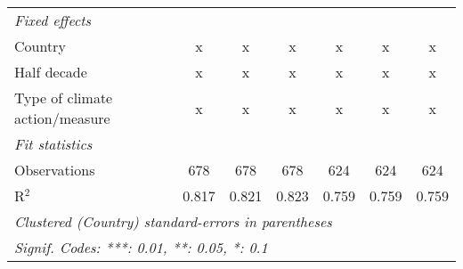 \begin{tabular}{lcccccc}
   \emph{Fixed effects}\\
   Country                                                        & x       & x             & x             & x             & x             & x\\  
   Half decade                                                    & x       & x             & x             & x             & x             & x\\  
   Type of climate action/measure                                 & x       & x             & x             & x             & x             & x\\  
   \midrule \emph{Fit statistics}\\
   Observations                                                   & 678     & 678           & 678           & 624           & 624           & 624\\  
   R$^2$                                                          & 0.817   & 0.821         & 0.823         & 0.759         & 0.759         & 0.759\\  
   \midrule
   \multicolumn{7}{l}{\emph{Clustered (Country) standard-errors in parentheses}}\\
   \multicolumn{7}{l}{\emph{Signif. Codes: ***: 0.01, **: 0.05, *: 0.1}}\\
\end{tabular}
\par\endgroup



